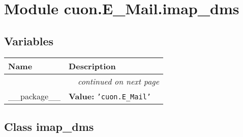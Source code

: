 %
%
%


\section{Module cuon.E\_Mail.imap\_dms}

    \label{cuon:E_Mail:imap_dms}


  \subsection{Variables}

    \vspace{-1cm}
\hspace{\varindent}\begin{longtable}{|p{\varnamewidth}|p{\vardescrwidth}|l}
\cline{1-2}
\cline{1-2} \centering \textbf{Name} & \centering \textbf{Description}& \\
\cline{1-2}
\endhead\cline{1-2}\multicolumn{3}{r}{\small\textit{continued on next page}}\\\endfoot\cline{1-2}
\endlastfoot\raggedright \_\-\_\-p\-a\-c\-k\-a\-g\-e\-\_\-\_\- & \raggedright \textbf{Value:} 
{\tt \texttt{'}\texttt{cuon.E\_Mail}\texttt{'}}&\\
\cline{1-2}
\end{longtable}



\subsection{Class imap\_dms}

